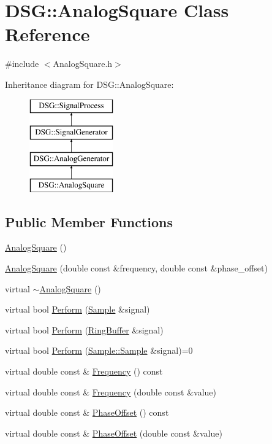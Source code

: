 \hypertarget{classDSG_1_1AnalogSquare}{\section{D\+S\+G\+:\+:Analog\+Square Class Reference}
\label{classDSG_1_1AnalogSquare}
}


{\ttfamily \#include $<$Analog\+Square.\+h$>$}

Inheritance diagram for D\+S\+G\+:\+:Analog\+Square\+:\begin{figure}[H]
\begin{center}
\leavevmode
\includegraphics[height=4.000000cm]{classDSG_1_1AnalogSquare}
\end{center}
\end{figure}
\subsection*{Public Member Functions}
\begin{DoxyCompactItemize}
\item 
\hyperlink{classDSG_1_1AnalogSquare_a7b374bcd40345aec6a63e1789c2de732}{Analog\+Square} ()
\item 
\hyperlink{classDSG_1_1AnalogSquare_a80192f3cb9a8e6a31121de58b8c4b1ea}{Analog\+Square} (double const \&frequency, double const \&phase\+\_\+offset)
\item 
virtual \hyperlink{classDSG_1_1AnalogSquare_acece15975ff370006ecd985de3ad0ada}{$\sim$\+Analog\+Square} ()
\item 
virtual bool \hyperlink{classDSG_1_1AnalogSquare_a93a4b464545a32f72491d3df490fd3f7}{Perform} (\hyperlink{classDSG_1_1Sample}{Sample} \&signal)
\item 
virtual bool \hyperlink{classDSG_1_1AnalogSquare_a1d9c8a380775a7e4f6e0aa8fb1b05af6}{Perform} (\hyperlink{classDSG_1_1RingBuffer}{Ring\+Buffer} \&signal)
\item 
virtual bool \hyperlink{classDSG_1_1SignalProcess_afdb8220100418893950c1161dd24db67}{Perform} (\hyperlink{classDSG_1_1Sample_aaf2e30d73911eccea99b53eeee15b612}{Sample\+::\+Sample} \&signal)=0
\item 
virtual double const \& \hyperlink{classDSG_1_1SignalGenerator_aedac746c5a70818d120858542ecb7c45}{Frequency} () const 
\item 
virtual double const \& \hyperlink{classDSG_1_1SignalGenerator_ae3ce8d45bafabbd86a0f535b15c3cd46}{Frequency} (double const \&value)
\item 
virtual double const \& \hyperlink{classDSG_1_1SignalGenerator_a1ce521847edd0b837fd840998f906b4b}{Phase\+Offset} () const 
\item 
virtual double const \& \hyperlink{classDSG_1_1SignalGenerator_a08b71b1f30ba65e629642c570291dc0e}{Phase\+Offset} (double const \&value)
\end{DoxyCompactItemize}
